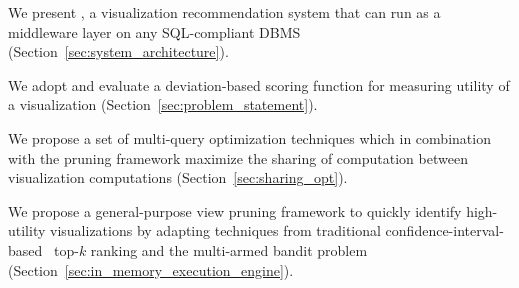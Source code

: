  
\begin{denselist}
  \item We present \SeeDB, a visualization recommendation system that can run
  as a middleware layer on any SQL-compliant DBMS (Section~\ref{sec:system_architecture}).
  \item We adopt and evaluate a deviation-based scoring function for measuring utility
  of a visualization (Section~\ref{sec:problem_statement}).
  \item We propose a set of multi-query optimization techniques which in combination
  with the pruning framework maximize the sharing of computation between visualization
  computations (Section~\ref{sec:sharing_opt}).
  \item We propose a general-purpose view pruning framework to quickly identify
  high-utility visualizations by adapting techniques from traditional 
  confidence-interval-based~\cite{hoeffding1963probability} top-$k$ ranking and the
   multi-armed bandit problem~\cite{bandits} (Section~\ref{sec:in_memory_execution_engine}).

\end{denselist}
